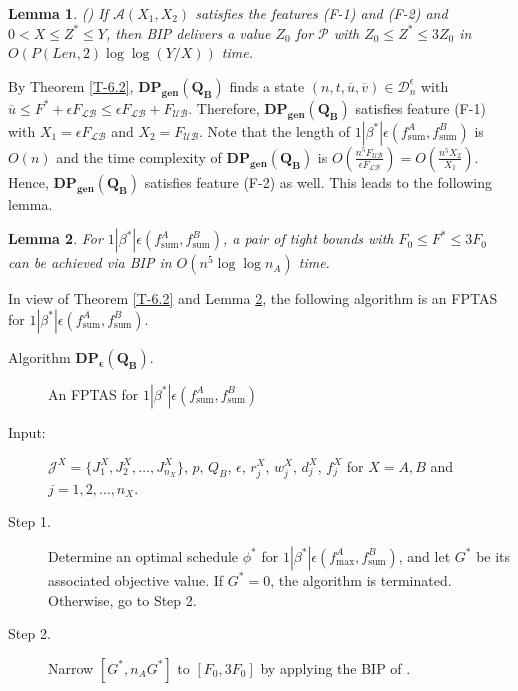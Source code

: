 \documentclass[12pt]{article}
\newtheorem{lemma}{Lemma}[section]
\begin{document}
\begin{sloppypar}
\begin{lemma} \label{L-6.2} (\citealp{ChubanovKP2006MP})
If $\mathcal{A}(X_1, X_2)$ satisfies the features (F-1) and (F-2) and $0 < X \leq Z^{*} \leq Y$, then
BIP delivers a value $Z_0$ for $\mathcal{P}$ with
$Z_0 \leq Z^{*} \leq 3 Z_0$ in $O(P(Len, 2) \log \log (Y/X))$ time.
\end{lemma}

By Theorem \ref{T-6.2}, $\mathbf{DP_{gen}(Q_B)}$ finds a state
$(n, t, \overline{u}, \overline{v}) \in \mathcal{D}_n^{\epsilon}$ with
$\overline{u} \leq F^{*} +\epsilon F_{\mathcal{LB}} \leq \epsilon F_{\mathcal{LB}}+F_{\mathcal{UB}}$. Therefore,  $\mathbf{DP_{gen}(Q_B)}$ satisfies feature (F-1) with $X_1=\epsilon F_{\mathcal{LB}}$ and $X_2=F_{\mathcal{UB}}$. Note that the length of $1 | \beta^{*}|\epsilon(f_{\mathrm{sum}}^A, f_{\mathrm{sum}}^B)$ is $O(n)$ and the time complexity of $\mathbf{DP_{gen}(Q_B)}$ is $O(\frac{n^5 F_{\mathcal{UB}}}{\epsilon F_{\mathcal{LB}}})=O(\frac{n^5 X_2}{X_1})$. Hence, $\mathbf{DP_{gen}(Q_B)}$ satisfies feature (F-2) as well. This leads to the following lemma.

\begin{lemma} \label{L-6.3}
For $1 | \beta^{*}|\epsilon(f_{\mathrm{sum}}^A, f_{\mathrm{sum}}^B)$, a pair of tight bounds with  $F_0 \leq F^{*} \leq 3 F_0$ can be achieved via BIP in $O(n^5 \log \log n_A)$ time.
\end{lemma}

In view of Theorem \ref{T-6.2} and Lemma \ref{L-6.3}, the following algorithm is an FPTAS for $1 | \beta^{*}|\epsilon(f_{\mathrm{sum}}^A, f_{\mathrm{sum}}^B)$.

\begin{description}
\item [Algorithm $\mathbf{DP_{\epsilon}(Q_B)}$.] An FPTAS for $1 | \beta^{*}|\epsilon(f_{\mathrm{sum}}^A, f_{\mathrm{sum}}^B)$

\item [Input:] ${\mathcal J}^{X}=\{J_1^{X}, J_2^{X}, \ldots, J_{n_X}^{X}\}$, $p$, $Q_B$, $\epsilon$, $r_j^X$, $w_j^X$, $d_j^X$, $f_j^X$ for $X = A,B$ and $j=1, 2, \ldots, n_X$.

\item [Step 1.] Determine an optimal schedule $\phi^{*}$ for $1 | \beta^{*}|\epsilon(f_{\mathrm{max}}^A, f_{\mathrm{sum}}^B)$, and let $G^{*}$ be its associated objective value. If $G^{*}=0$, the algorithm is terminated. Otherwise, go to Step 2.

\item [Step 2.] Narrow $[G^{*}, n_A G^{*}]$ to $[F_0, 3 F_0]$ by applying the BIP of \cite{ChubanovKP2006MP}.


\end{description}
\end{sloppypar}
\end{document}

